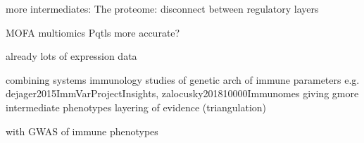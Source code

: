 \begin{outline}
    more intermediates:
        The proteome: disconnect between regulatory layers

    MOFA
    multiomics
        Pqtls more accurate?

    already lots of expression data

    combining systems immunology studies of genetic arch of immune parameters
            e.g. dejager2015ImmVarProjectInsights, zalocusky201810000Immunomes
        giving gmore intermediate phenotypes
        layering of evidence (triangulation)

    with GWAS of immune phenotypes

%
%
%
%
%
%
%
%
%


\end{outline}
